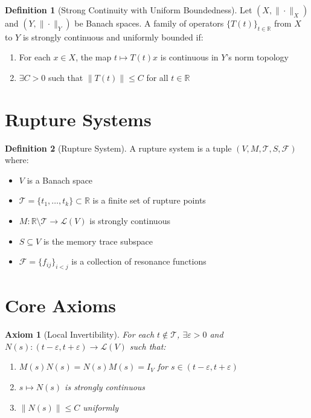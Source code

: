 \documentclass[12pt]{article}
\theoremstyle{definition}
\newtheorem{definition}{Definition}
\theoremstyle{plain}
\newtheorem{axiom}{Axiom}
\begin{document}
\begin{definition}[Strong Continuity with Uniform Boundedness]
Let $(X, \|\cdot\|_X)$ and $(Y, \|\cdot\|_Y)$ be Banach spaces. A family of operators $\{T(t)\}_{t \in \mathbb{R}}$ from $X$ to $Y$ is strongly continuous and uniformly bounded if:
\begin{enumerate}
    \item For each $x \in X$, the map $t \mapsto T(t)x$ is continuous in $Y$'s norm topology
    \item $\exists C > 0$ such that $\|T(t)\| \leq C$ for all $t \in \mathbb{R}$
\end{enumerate}
\end{definition}

\section{Rupture Systems}

\begin{definition}[Rupture System]
A rupture system is a tuple $(V, M, \mathcal{T}, S, \mathcal{F})$ where:
\begin{itemize}
    \item $V$ is a Banach space
    \item $\mathcal{T} = \{t_1,\ldots,t_k\} \subset \mathbb{R}$ is a finite set of rupture points
    \item $M: \mathbb{R} \setminus \mathcal{T} \to \mathcal{L}(V)$ is strongly continuous
    \item $S \subseteq V$ is the memory trace subspace
    \item $\mathcal{F} = \{f_{ij}\}_{i<j}$ is a collection of resonance functions
\end{itemize}
\end{definition}

\section{Core Axioms}

\begin{axiom}[Local Invertibility]
For each $t \notin \mathcal{T}$, $\exists \varepsilon > 0$ and $N(s): (t-\varepsilon, t+\varepsilon) \to \mathcal{L}(V)$ such that:
\begin{enumerate}
    \item $M(s)N(s) = N(s)M(s) = I_V$ for $s \in (t-\varepsilon, t+\varepsilon)$
    \item $s \mapsto N(s)$ is strongly continuous
    \item $\|N(s)\| \leq C$ uniformly
\end{enumerate}
\end{axiom}
\end{document}
